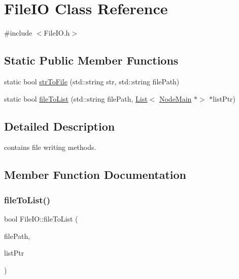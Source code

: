 \hypertarget{class_file_i_o}{}\section{File\+IO Class Reference}
\label{class_file_i_o}


{\ttfamily \#include $<$File\+I\+O.\+h$>$}

\subsection*{Static Public Member Functions}
\begin{DoxyCompactItemize}
\item 
static bool \hyperlink{class_file_i_o_ac3a2546c33e52aab6f4b9376d5c41d5e}{str\+To\+File} (std\+::string str, std\+::string file\+Path)
\item 
static bool \hyperlink{class_file_i_o_a7ef3f816ce047c60c887c38f3a9717d7}{file\+To\+List} (std\+::string file\+Path, \hyperlink{class_list}{List}$<$ \hyperlink{class_node_main}{Node\+Main} $\ast$$>$ $\ast$list\+Ptr)
\end{DoxyCompactItemize}


\subsection{Detailed Description}
contains file writing methods. 

\subsection{Member Function Documentation}
\mbox{\label{class_file_i_o_a7ef3f816ce047c60c887c38f3a9717d7}} 
\subsubsection{\texorpdfstring{file\+To\+List()}{fileToList()}}
{\footnotesize\ttfamily bool File\+I\+O\+::file\+To\+List (\begin{DoxyParamCaption}\item[{std\+::string}]{file\+Path,  }\item[{\hyperlink{class_list}{List}$<$ \hyperlink{class_node_main}{Node\+Main} $\ast$$>$ $\ast$}]{list\+Ptr }\end{DoxyParamCaption})\hspace{0.3cm}{\ttfamily [static]}}

